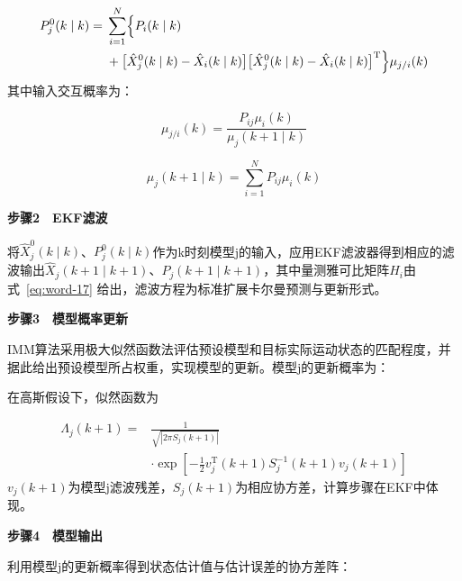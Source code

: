 \documentclass[UTF8,a4paper,zihao=-4]{ctexart}
\begin{document}
\begin{equation}
\begin{aligned}
P_j^0(k\mid k)={}&\sum_{i=1}^{N}\Bigl\{P_i(k\mid k)\\
&+\bigl[\hat{X}_j^0(k\mid k)-\hat{X}_i(k\mid k)\bigr]\bigl[\hat{X}_j^0(k\mid k)-\hat{X}_i(k\mid k)\bigr]^{\mathrm T}\Bigr\}\mu_{j/i}(k)
\end{aligned}
\label{eq:word-55}
\end{equation}
其中输入交互概率为：


\begin{equation}
\mu_{j/i}(k)=\frac{P_{ij}\mu_i(k)}{\mu_j(k+1\mid k)}
\label{eq:word-56}
\end{equation}



\begin{equation}
\mu_j(k+1\mid k)=\sum_{i=1}^{N}P_{ij}\mu_i(k)
\label{eq:word-57}
\end{equation}


\noindent\textbf{步骤2　EKF滤波}\par

将\(\hat{X}_j^0(k\mid k)\)、\(P_j^0(k\mid k)\)作为k时刻模型j的输入，应用EKF滤波器得到相应的滤波输出\(\hat{X}_j(k+1\mid k+1)\)、\(P_j(k+1\mid k+1)\)，其中量测雅可比矩阵\(H_i\)由式~\eqref{eq:word-17} 给出，滤波方程为标准扩展卡尔曼预测与更新形式。

\noindent\textbf{步骤3　模型概率更新}\par

IMM算法采用极大似然函数法评估预设模型和目标实际运动状态的匹配程度，并据此给出预设模型所占权重，实现模型的更新。模型j的更新概率为：





在高斯假设下，似然函数为


\begin{equation}
\begin{aligned}
\Lambda_j(k+1)={}&\frac{1}{\sqrt{|2\pi S_j(k+1)|}}\\
&\cdot\exp\!\left[-\frac12 v_j^{\mathrm T}(k+1)S_j^{-1}(k+1)v_j(k+1)\right]
\end{aligned}
\label{eq:word-63}
\end{equation}
\(v_j(k+1)\)为模型j滤波残差，\(S_j(k+1)\)为相应协方差，计算步骤在EKF中体现。

\noindent\textbf{步骤4　模型输出}\par

利用模型j的更新概率得到状态估计值与估计误差的协方差阵：
\end{document}
